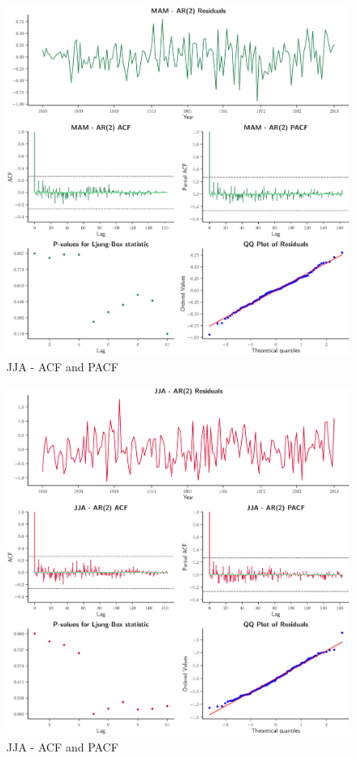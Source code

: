 \documentclass[12pt]{article}
\begin{document}
\begin{figure}[!htbp]
  \includegraphics[width=1\textwidth,center]{figs/mam_res}
  \caption{JJA - ACF and PACF}\label{mam_res}
\end{figure}

\begin{figure}[!htbp]
  \centering
  \includegraphics[width=1\textwidth,center]{figs/jja_res}
  \caption{JJA - ACF and PACF}\label{jja_res}
\end{figure}
\end{document}
